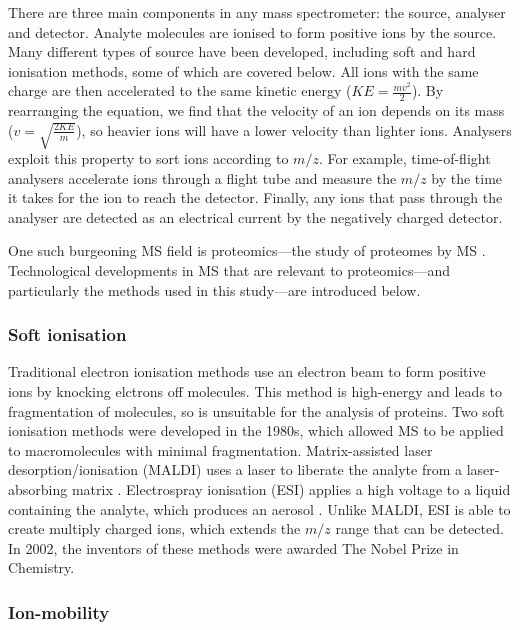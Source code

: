 There are three main components in any mass spectrometer: the source, analyser and detector.
Analyte molecules are ionised to form positive ions by the source.
Many different types of source have been developed, including soft and hard ionisation methods, some of which are covered below.
All ions with the same charge are then accelerated to the same kinetic energy ($KE = \frac{mv^2}{2}$).
By rearranging the equation, we find that the velocity of an ion depends on its mass ($v = \sqrt{\frac{2KE}{m}}$), so heavier ions will have a lower velocity than lighter ions.
Analysers exploit this property to sort ions according to $m/z$.
For example, time-of-flight analysers accelerate ions through a flight tube and measure the $m/z$ by the time it takes for the ion to reach the detector.
Finally, any ions that pass through the analyser are detected as an electrical current by the negatively charged detector.

One such burgeoning MS field is proteomics---the study of proteomes by MS \cite{Wasinger1995,Aebersold2003}.
Technological developments in MS that are relevant to proteomics---and particularly the methods used in this study---are introduced below.

\subsubsection{Soft ionisation}

Traditional electron ionisation methods use an electron beam to form positive ions by knocking elctrons off molecules.
This method is high-energy and leads to fragmentation of molecules, so is unsuitable for the analysis of proteins.
Two soft ionisation methods were developed in the 1980s, which allowed MS to be applied to macromolecules with minimal fragmentation.
Matrix-assisted laser desorption/ionisation (MALDI) uses a laser to liberate the analyte from a laser-absorbing matrix \cite{Tanaka1988,Karas1985}.
Electrospray ionisation (ESI) applies a high voltage to a liquid containing the analyte, which produces an aerosol \cite{Whitehouse1985}.
Unlike MALDI, ESI is able to create multiply charged ions, which extends the $m/z$ range that can be detected.
In 2002, the inventors of these methods were awarded The Nobel Prize in Chemistry.

\subsubsection{Ion-mobility}

